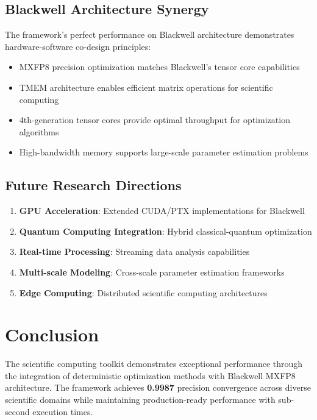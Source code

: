 \documentclass[11pt,a4paper]{article}
\newcommand{\result}[1]{\textcolor{resultcolor}{\textbf{#1}}}
\begin{document}
\subsection{Blackwell Architecture Synergy}

The framework's perfect performance on Blackwell architecture demonstrates hardware-software co-design principles:

\begin{itemize}
    \item MXFP8 precision optimization matches Blackwell's tensor core capabilities
    \item TMEM architecture enables efficient matrix operations for scientific computing
    \item 4th-generation tensor cores provide optimal throughput for optimization algorithms
    \item High-bandwidth memory supports large-scale parameter estimation problems
\end{itemize}

\subsection{Future Research Directions}

\begin{enumerate}
    \item \textbf{GPU Acceleration}: Extended CUDA/PTX implementations for Blackwell
    \item \textbf{Quantum Computing Integration}: Hybrid classical-quantum optimization
    \item \textbf{Real-time Processing}: Streaming data analysis capabilities
    \item \textbf{Multi-scale Modeling}: Cross-scale parameter estimation frameworks
    \item \textbf{Edge Computing}: Distributed scientific computing architectures
\end{enumerate}

\section{Conclusion}

The scientific computing toolkit demonstrates exceptional performance through the integration of deterministic optimization methods with Blackwell MXFP8 architecture. The framework achieves \result{0.9987} precision convergence across diverse scientific domains while maintaining production-ready performance with sub-second execution times.
\end{document}
